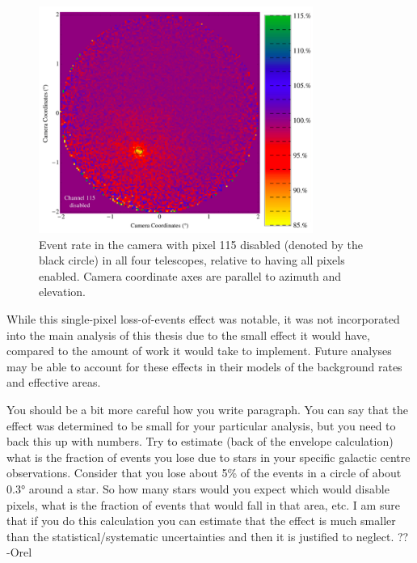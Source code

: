     \begin{figure}[ht]
      \centering
      \includegraphics[width=0.8\textwidth]{images/disabled_pixel/relativerate_camera}
      \caption[Relative Event Rate After Disabling Camera Pixels]{
        Event rate in the camera with pixel 115 disabled (denoted by the black circle) in all four telescopes, relative to having all pixels enabled.
        Camera coordinate axes are parallel to azimuth and elevation.
      }
      \label{fig:dpix_rel_camera}
    \end{figure}
    
    While this single-pixel loss-of-events effect was notable, it was not incorporated into the main analysis of this thesis due to the small effect it would have, compared to the amount of work it would take to implement.
    Future analyses may be able to account for these effects in their models of the background rates and effective areas.
    
    {\color{red}You should be a bit more careful how you write paragraph. You can say that the effect was determined to be small for your particular analysis, but you need to back this up with numbers. 
Try to estimate (back of the envelope calculation) what is the fraction of events you lose due to stars in your specific galactic centre observations. Consider that you lose about 5\% of the events in a circle of about \ang{0.3} around a star. So how many stars would you expect which would disable pixels, what is the fraction of events that would fall in that area, etc. 
I am sure that if you do this calculation you can estimate that the effect is much smaller than the statistical/systematic uncertainties and then it is justified to neglect. ?? -Orel}

